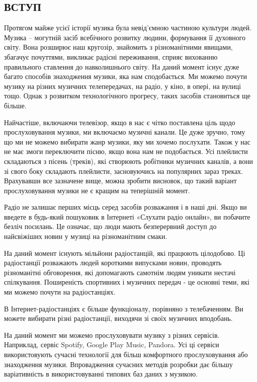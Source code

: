 \begin{center}\chapter*{ВСТУП}\end{center}

    Протягом майже усієї історії музика була невід’ємною частиною культури людей. Музика – могутній засіб всебічного розвитку людини, формування її духовного світу. Вона розширює наш кругозір, знайомить з різноманітними явищами, збагачує почуттями, викликає радісні переживання, сприяє вихованню правильного ставлення до навколишнього світу. На даний момент існує дуже багато способів знаходження музики, яка нам сподобається. Ми можемо почути музику на різних музичних телепередачах, на радіо, у кіно, в опері, на вулиці тощо. Однак з розвитком технологічного прогресу, таких засобів становиться ще більше.

    Найчастіше, включаючи телевізор, якщо в нас є чітко поставлена ціль щодо прослуховування музики, ми включаємо музичні канали. Це дуже зручно, тому що ми не можемо вибирати жанр музики, яку ми хочемо послухати. Також у нас не має змоги переключити пісню, якщо вона нам не подобається. Усі плейлисти складаються з пісень (треків), які створюють робітники музичних каналів, а вони зі свого боку складають плейлисти, засновуючись на популярних зараз треках. Врахувавши все зазначене вище, можна зробити висновок, що такий варіант прослуховування музики не є кращим на теперішній момент.

    Радіо не залишає перших місць серед засобів розважання і в наші дні. Якщо ви введете в будь-який пошуковик в Інтернеті «Слухати радіо онлайн», ви побачите безліч посилань. Це означає, що люди мають безперервний доступ до найсвіжіших новин у музиці на різноманітним смаки.

    На даний момент існують мільйони радіостанцій, які працюють цілодобово. Ці радіостанції розважають людей короткими випусками новин, проводять різноманітні обговорення, які допомагають самотнім людям уникати нестачі спілкування. Поширеність спортивних і музичних передач - це основні теми, які ми можемо почути на радіостанціях.

    В Інтернет-радіостанціях є більше функціоналу, порівняно з телебаченням. Ви можете вибирати різні радіостанції, виходячи зі своїх музичних вподобань.

    На даний момент ми можемо прослуховувати музику з різних сервісів. Наприклад, сервіс Spotify, Google Play Music, Pandora. Усі ці сервіси використовують сучасні технології для більш комфортного прослуховування або знаходження музики. Впровадження сучасних методів розробки дає більшу варіативність в використовуванні типових баз даних з музикою.

